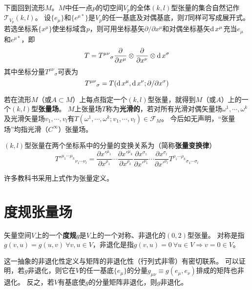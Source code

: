 下面回到流形$M$。$M$中任一点$p$的切空间$V_p$的全体$(k, l)$型张量的集合自然记作$\mathscr{T}_{V_p}(k, l)$。
设$\{e_\mu\}$和$\{e^{\mu*}\}$是$V_p$的任一基底及对偶基底，则$T$同样可写成展开式。
若选坐标系$\{x^\mu\}$使坐标域含$p$，则可用坐标基矢$\partial / \partial x^\mu$和对偶坐标基矢$\operatorname{d} x^\mu$充当$e_\mu$和$e^{\mu*}$，即
$$T = T^{\mu\nu}{}_\sigma\frac{\partial}{\partial x^\mu}\otimes\frac{\partial}{\partial x^\nu}\otimes\operatorname{d} x^\sigma$$
其中坐标分量$T^{\mu\nu}{}_\sigma$可表为
$$T^{\mu\nu}{}_\sigma = T(\operatorname{d} x^\mu, \operatorname{d} x^\nu; \partial / \partial x^\sigma)$$

若在流形$M$（或$A \subset M$）上每点指定一个$(k, l)$型张量，就得到$M$（或$A$）上的一个$(k, l)$型\textbf{张量场}。
$M$上张量场$T$称为\textbf{光滑的}，若对所有光滑对偶矢量场$\omega^1, \cdots, \omega^k$及光滑矢量场$v_1, \cdots, v_l$有$T(\omega^1, \cdots, \omega^k; v_1, \cdots, v_l) \in \mathscr{F}_M$。
今后如无声明，``张量场''均指光滑（$C^\infty$）张量场。

\begin{theorem}
$(k, l)$型张量在两个坐标系中的分量的变换关系为（简称\textbf{张量变换律}）
$$T'^{\mu_1\cdots\mu_k}{}_{\nu_1\cdots\nu_l} = \frac{\partial x'^{\mu_1}}{\partial x^{\rho_1}}\cdots\frac{\partial x'^{\mu_k}}{\partial x^{\rho_k}}\frac{\partial x^{\sigma_1}}{\partial x'^{\nu_1}}\cdots\frac{\partial x^{\sigma_l}}{\partial x'^{\nu_l}}T^{\rho_1\cdots\rho_k}{}_{\sigma_1\cdots\sigma_l}$$
\end{theorem}

\begin{note}
许多教科书采用上式作为张量定义。
\end{note}

\section{度规张量场}

\begin{definition}
矢量空间$V$上的一个\textbf{度规}$g$是$V$上的一个对称、非退化的$(0, 2)$型张量。
对称是指$g(v, u) = g(u, v) ~ \forall v, u \in V$，非退化是指$g(v, u) = 0 ~ \forall u \in V \Rightarrow v = 0 \in V$。
\end{definition}

\begin{note}
这一抽象的非退化性定义与矩阵的非退化性（行列式非零）有密切联系。
可以证明，若$g$非退化，则它在$V$的任一基底$\{e_\mu\}$的分量$g_{\mu\nu} \equiv g(e_\mu, e_\nu)$排成的矩阵也非退化。
反之，若$V$有基底使$g$的分量矩阵非退化，则$g$非退化。
\end{note}


